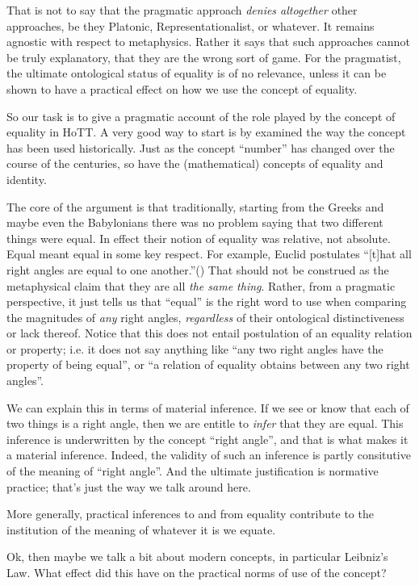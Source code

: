 That is not to say that the pragmatic approach \textit{denies
  altogether} other approaches, be they Platonic, Representationalist,
or whatever. It remains agnostic with respect to metaphysics. Rather
it says that such approaches cannot be truly explanatory, that they
are the wrong sort of game. For the pragmatist, the ultimate
ontological status of equality is of no relevance, unless it can be
shown to have a practical effect on how we use the concept of
equality.

So our task is to give a pragmatic account of the role played by the
concept of equality in HoTT. A very good way to start is by examined
the way the concept has been used historically. Just as the concept
``number'' has changed over the course of the centuries, so have the
(mathematical) concepts of equality and identity.

The core of the argument is that traditionally, starting from the
Greeks and maybe even the Babylonians there was no problem saying that
two different things were equal. In effect their notion of equality
was relative, not absolute. Equal meant equal in some key respect. For
example, Euclid postulates \enquote{[t]hat all right angles are equal
  to one another.}(\cite{euclid}) That should not be construed as the
metaphysical claim that they are all \textit{the same thing}. Rather,
from a pragmatic perspective, it just tells us that ``equal'' is the
right word to use when comparing the magnitudes of \textit{any} right
angles, \textit{regardless} of their ontological distinctiveness or
lack thereof. Notice that this does not entail postulation of an
equality relation or property; i.e. it does not say anything like
``any two right angles have the property of being equal'', or ``a
relation of equality obtains between any two right angles''.

We can explain this in terms of material inference. If we see or know
that each of two things is a right angle, then we are entitle to
\textit{infer} that they are equal. This inference is underwritten by
the concept ``right angle'', and that is what makes it a material
inference. Indeed, the validity of such an inference is partly
consitutive of the meaning of ``right angle''. And the ultimate
justification is normative practice; that's just the way we talk
around here.

More generally, practical inferences to and from equality contribute
to the institution of the meaning of whatever it is we equate.

Ok, then maybe we talk a bit about modern concepts, in particular
Leibniz's Law. What effect did this have on the practical norms of use
of the concept?

